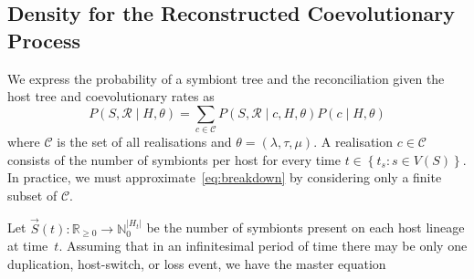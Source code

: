 \documentclass{article}
\begin{document}
        \subsection*{Density for the Reconstructed Coevolutionary Process}

            We express the probability of a symbiont tree and the
            reconciliation given the host tree and coevolutionary rates as
            \begin{equation}
                \label{eq:breakdown}
                P\left(S,\mathcal{R} \mid H,\theta\right) =
                    \sum_{c\in\mathcal{C}}
                    {P\left(S,\mathcal{R} \mid c, H,\theta\right)
                    P\left(c\mid H,\theta\right)}
            \end{equation}
            where $\mathcal{C}$ is the set of all realisations and $\theta =
            \left(\lambda, \tau, \mu\right)$. A realisation $c \in \mathcal{C}$
            consists of the number of symbionts per host for every time $t \in
            \left\{t_s : s \in V\left(S\right)\right\}$. In practice, we must
            approximate~\eqref{eq:breakdown} by considering only a finite
            subset of $\mathcal{C}$.

            Let $\vec{S}\left(t\right) : \mathbb{R}_{\geq 0} \to
            \mathbb{N}_{0}^{\lvert{H_t}\rvert}$ be the number of symbionts
            present on each host lineage at time~$t$. Assuming that in an
            infinitesimal period of time there may be only one duplication,
            host-switch, or loss event, we have the master equation
\end{document}
